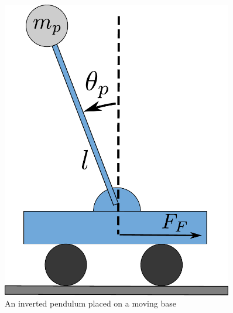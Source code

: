 \begin{figure}[H]
\centering
	\begin{minipage}{0.45\textwidth}

	\includegraphics[width=0.9\textwidth]{figures/invertedPendulum.pdf}
	\caption{An inverted pendulum placed on a moving base}
	\label{invertedPendulum}
	\end{minipage}
	\hspace{0.08\textwidth}
	\begin{minipage}{0.40\textwidth}

\end{minipage}
\end{figure}
